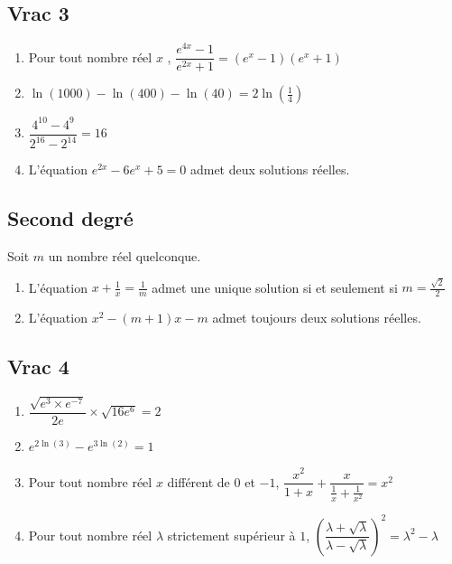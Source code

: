 \documentclass[oneside,12pt]{article}
\begin{document}
\subsection{Vrac 3}
\begin{enumerate}
	\item Pour tout nombre réel $x$ , $\dfrac{e^{4x}-1}{e^{2x}+1}=(e^x-1)(e^x+1)$
	\item $\ln(1000)-\ln(400)-\ln(40)=2\ln\left(\frac{1}{4}\right)$
	\item  $\dfrac{4^{10}-4^9}{2^{16}-2^{14}}=16$
	\item L'équation $e^{2x}-6e^x+5=0$ admet deux solutions réelles.
\end{enumerate}



\subsection{Second degré}
Soit $m$ un nombre réel quelconque.
\begin{enumerate}
	\item L'équation $x+\frac{1}{x}=\frac{1}{m}$ admet une unique solution si et seulement si $m=\frac{\sqrt{2}}{2}$
	\item L'équation $x^2-(m+1)x-m$ admet toujours deux solutions réelles.
\end{enumerate}



\subsection{Vrac 4}
\begin{enumerate}
    \item $\dfrac{\sqrt{e^3\times e^{-7}}}{2e}\times\sqrt{16e^6}=2$
    \item $e^{2\ln(3)}-e^{3\ln(2)}=1$
    \item Pour tout nombre réel $x$ différent de $0$ et $-1$, $\dfrac{x^2}{1+x}+\dfrac{x}{\frac{1}{x}+\frac{1}{x^2}}=x^2$
    \item Pour tout nombre réel $\lambda$ strictement supérieur à $1$, $\left(\dfrac{\lambda+\sqrt{\lambda}}{\lambda-\sqrt{\lambda}}\right)^2=\lambda^2-\lambda$
\end{enumerate}
\end{document}
